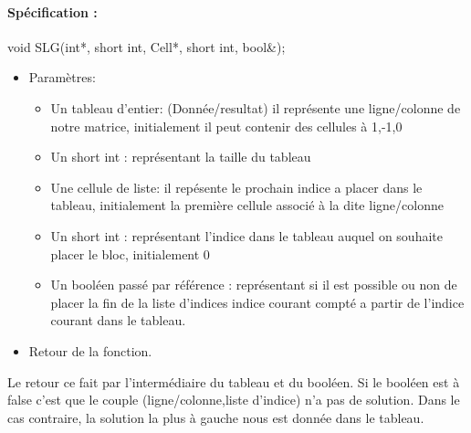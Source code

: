 \documentclass{article}
\begin{document}
\paragraph{Spécification :}
 void SLG(int*, short int, Cell*, short int, bool\&);
\begin{itemize}
\item Paramètres:
\begin{itemize}
\item Un tableau d'entier: (Donnée/resultat) il représente une ligne/colonne de notre matrice, initialement il peut contenir des cellules à 1,-1,0
\item Un short int : représentant la taille du tableau
\item Une cellule de liste: il repésente le prochain indice a placer dans le tableau, initialement la première cellule associé à la dite ligne/colonne
\item Un short int : représentant l'indice dans le tableau auquel on souhaite placer le bloc, initialement 0
\item Un booléen passé par référence : représentant si il est possible ou non de placer la fin de la liste d'indices indice courant compté a partir de l'indice courant dans le tableau.
\end{itemize}
\item Retour de la fonction.
\end{itemize}
Le retour ce fait par l'intermédiaire du tableau et du booléen. Si le booléen est à false c'est que le couple (ligne/colonne,liste d'indice) n'a pas de solution. Dans le cas contraire, la solution la plus à gauche nous est donnée dans le tableau.
\end{document}
